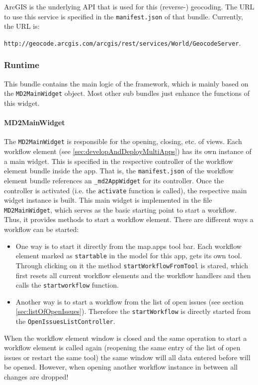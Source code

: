 ArcGIS is the underlying API that is used for this (reverse-) geocoding. The URL to use this service is specified in the \lstinline|manifest.json| of that bundle. Currently, the URL is:

 \lstinline|http://geocode.arcgis.com/arcgis/rest/services/World/GeocodeServer|. 

\subsubsection{Runtime}

This bundle contains the main logic of the \MD \mapapps framework, which is mainly based on the \lstinline|MD2MainWidget| object. Most other sub bundles just enhance the functions of this widget.

\paragraph{MD2MainWidget}
The \lstinline!MD2MainWidget! is responsible for the opening, closing, etc. of views. 
Each workflow element (see \ref{sec:developAndDeployMultiApps}) has its own instance of a \MD main widget. This is specified in the respective controller of the workflow element bundle inside the app. That is, the \lstinline!manifest.json! of the workflow element bundle references an \lstinline!_md2AppWidget! for its controller. Once the controller is activated (i.e. the \lstinline!activate! function is called), the respective \MD main widget instance is built. This \MD main widget is implemented in the file \lstinline!MD2MainWidget!, which serves as the basic starting point to start a workflow. Thus, it provides methods to start a workflow element. There are different ways a workflow can be started:
\begin{itemize}
	\item One way is to start it directly from the map.apps tool bar. Each workflow element marked as \lstinline|startable| in the model for this app, gets its own tool. Through clicking on it the method \lstinline|startWorkflowFromTool| is stared, which first resets all current workflow elements and the workflow handlers and then calls the \lstinline|startworkflow| function.
	\item Another way is to start a workflow from the list of open issues (see section \ref{sec:listOfOpenIssues}). Therefore the \lstinline|startWorkflow| is directly started from the \lstinline|OpenIssuesListController|.
\end{itemize}
When the workflow element window is closed and the same operation to start a workflow element is called again (reopening the same entry of the list of open issues or restart the same tool) the same window will all data entered before will be opened. However, when opening another workflow instance in between all changes are dropped!
